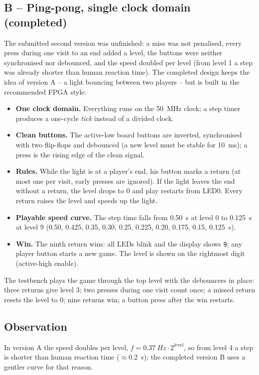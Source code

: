 \subsection{B -- Ping-pong, single clock domain (completed)}
The submitted second version was unfinished: a miss was not penalised, every press during one visit to
an end added a level, the buttons were neither synchronised nor debounced, and the speed doubled per level
(from level 1 a step was already shorter than human reaction time). The completed design keeps the idea of
version A -- a light bouncing between two players -- but is built in the recommended FPGA style:
\begin{itemize}
  \item \textbf{One clock domain.} Everything runs on the \SI{50}{MHz} clock; a step timer produces a
        one-cycle \emph{tick} instead of a divided clock.
  \item \textbf{Clean buttons.} The active-low board buttons are inverted, synchronised with two flip-flops
        and debounced (a new level must be stable for \SI{10}{ms}); a press is the rising edge of the clean
        signal.
  \item \textbf{Rules.} While the light is at a player's end, his button marks a return (at most one per
        visit, early presses are ignored). If the light leaves the end without a return, the level drops to 0
        and play restarts from LED0. Every return raises the level and speeds up the light.
  \item \textbf{Playable speed curve.} The step time falls from \SI{0.50}{s} at level 0 to \SI{0.125}{s} at
        level 9 (0.50, 0.425, 0.35, 0.30, 0.25, 0.225, 0.20, 0.175, 0.15, \SI{0.125}{s}).
  \item \textbf{Win.} The ninth return wins: all LEDs blink and the display shows \texttt{9}; any
        player button starts a new game. The level is shown on the rightmost digit (active-high enable).
\end{itemize}
The testbench plays the game through the top level with the debouncers in place: three returns give
level 3; two presses during one visit count once; a missed return resets the level to 0; nine returns
win; a button press after the win restarts.

\subsection{Observation}
In version A the speed doubles per level, $f = \SI{0.37}{Hz}\cdot 2^{\text{level}}$, so from level 4 a step
is shorter than human reaction time ($\approx$\SI{0.2}{s}); the completed version B uses a gentler curve
for that reason.


